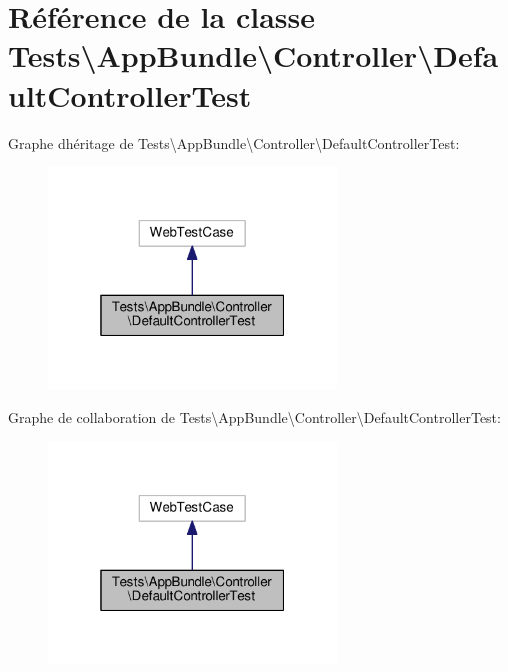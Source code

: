 \hypertarget{classTests_1_1AppBundle_1_1Controller_1_1DefaultControllerTest}{}\section{Référence de la classe Tests\textbackslash{}App\+Bundle\textbackslash{}Controller\textbackslash{}Default\+Controller\+Test}
\label{classTests_1_1AppBundle_1_1Controller_1_1DefaultControllerTest}


Graphe d\textquotesingle{}héritage de Tests\textbackslash{}App\+Bundle\textbackslash{}Controller\textbackslash{}Default\+Controller\+Test\+:\nopagebreak
\begin{figure}[H]
\begin{center}
\leavevmode
\includegraphics[width=217pt]{classTests_1_1AppBundle_1_1Controller_1_1DefaultControllerTest__inherit__graph}
\end{center}
\end{figure}


Graphe de collaboration de Tests\textbackslash{}App\+Bundle\textbackslash{}Controller\textbackslash{}Default\+Controller\+Test\+:\nopagebreak
\begin{figure}[H]
\begin{center}
\leavevmode
\includegraphics[width=217pt]{classTests_1_1AppBundle_1_1Controller_1_1DefaultControllerTest__coll__graph}
\end{center}
\end{figure}
